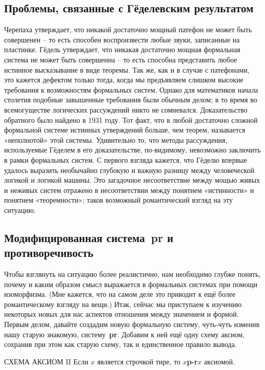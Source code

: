 \documentclass[../main.tex]{subfiles}
\begin{document}
\subsection{Проблемы, связанные с Гёделевским результатом}

Черепаха утверждает, что никакой достаточно мощный патефон не может быть совершенен \--- то есть способен воспроизвести любые звуки, записанные на пластинке. Гёдель утверждает, что никакая достаточно мощная формальная система не может быть совершенна \--- то есть способна представить любое истинное высказывание в виде теоремы. Так же, как и в случае с патефонами, это кажется дефектом только тогда, когда мы предъявляем слишком высокие требования к возможностям формальных систем. Однако для математиков начала столетия подобные завышенные требования были обычным делом; в то время во всемогуществе логических рассуждений никто не сомневался. Доказательство обратного было найдено в 1931 году. Тот факт, что в любой достаточно сложной формальной системе истинных утверждений больше, чем теорем, называется «неполнотой» этой системы. Удивительно то, что методы рассуждения, используемые Гёделем в его доказательстве, по-видимому, невозможно заключить в рамки формальных систем. С первого взгляда кажется, что Гёделю впервые удалось выразить необычайно глубокую и важную разницу между человеческой логикой и логикой машины. Это загадочное несоответствие между мощью живых и неживых систем отражено в несоответствии между понятием «истинности» и понятием «теоремности»; таков возможный романтический взгляд на эту ситуацию.


\subsection{Модифицированная система~\textbf{pr} и противоречивость}

Чтобы взглянуть на ситуацию более реалистично, нам необходимо глубже понять, почему и каким образом смысл выражается в формальных системах при помощи изоморфизма.
(Мне кажется, что на самом деле это приводит к ещё более романтическому взгляду на вещи.)
Итак, сейчас мы приступаем к изучению некоторых новых для нас аспектов отношения между значением и формой.
Первым делом, давайте создадим новую формальную систему, чуть-чуть изменив нашу старую знакомую, систему~\textbf{pr}.
Добавим к ней ещё одну схему аксиом, сохранив при этом как старую схему, так и единственное правило вывода.

\begin{mybox}{СХЕМА АКСИОМ II}
    Если $x$ является строчкой тире, то \textbf{$x$p-r$x$} аксиомой.
\end{mybox}
\end{document}
